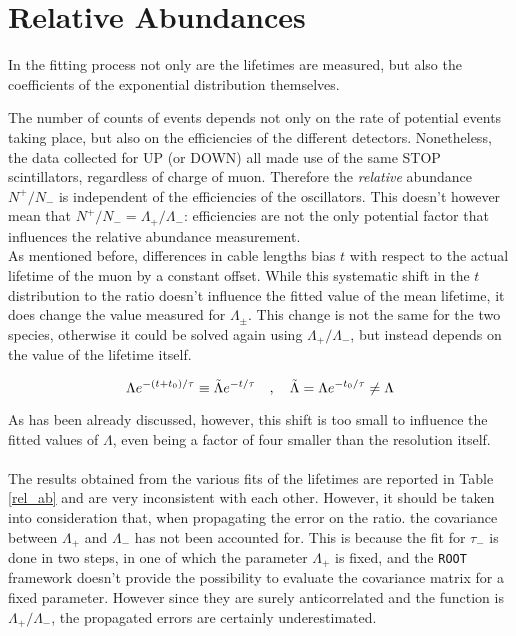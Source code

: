 \documentclass[10pt,a4paper,twocolumn]{article}
\begin{document}
\section{Relative Abundances}

In the fitting process not only are the lifetimes are measured, but also the coefficients of the exponential distribution themselves. 

The number of counts of events depends not only on the rate of potential events taking place, but also on the efficiencies of the different detectors. Nonetheless, the data collected for UP (or DOWN) all made use of the same STOP scintillators, regardless of charge of muon. Therefore the \textit{relative} abundance $N^+/N_-$ is independent of the efficiencies of the oscillators. This doesn't however mean that $N^+/N_-=\Lambda_+/\Lambda_-$: efficiencies are not the only potential factor that influences the relative abundance measurement.
\\
As mentioned before, differences in cable lengths bias $t$ with respect to the actual lifetime of the muon by a constant offset. While this systematic shift in the $t$ distribution to the ratio doesn't influence the fitted value of the mean lifetime, it does change the value measured for $\Lambda_\pm$. This change is not the same for the two species, otherwise it could be solved again using $\Lambda_+/\Lambda_-$, but instead depends on the value of the lifetime itself.

\begin{equation}
\label{exposhift}
    \Lambda e^{-(t+t_0)/\tau}\equiv \Tilde{\Lambda}e^{-t/\tau} \quad , \quad \Tilde{\Lambda}=\Lambda e^{-t_0/\tau}\neq \Lambda
\end{equation}

As has been already discussed, however, this shift is too small to influence the fitted values of $\Lambda$, even being a factor of four smaller than the resolution itself.
\\
\\
The results obtained from the various fits of the lifetimes are reported in Table \ref{rel_ab} and are very inconsistent with each other. However, it should be taken into consideration that, when propagating the error on the ratio. the covariance between $\Lambda_+$ and $\Lambda_-$ has not been accounted for. This is because the fit for $\tau_-$ is done in two steps, in one of which the parameter $\Lambda_+$ is fixed, and the \texttt{ROOT} framework doesn't provide the possibility to evaluate the covariance matrix for a fixed parameter. However since they are surely anticorrelated and the function is $\Lambda_+/\Lambda_-$, the propagated errors are certainly underestimated.
\end{document}
